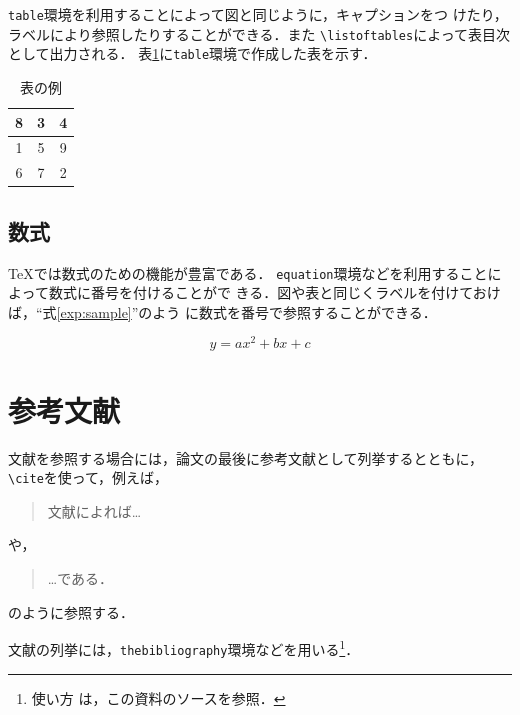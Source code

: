 \documentclass[11pt]{jreport}
\begin{document}
{\tt table}環境を利用することによって図と同じように，キャプションをつ
けたり，ラベルにより参照したりすることができる．また
\verb|\listoftables|によって表目次として出力される．
表\ref{tab:sample}に{\tt table}環境で作成した表を示す．

\begin{table}
  \caption{表の例}
  \label{tab:sample}
  \begin{center}
    \begin{tabular}{|c|c|c|}
      \hline
      8 & 3 & 4\\
      \hline
      1 & 5 & 9 \\
      \hline
      6 & 7 & 2 \\
      \hline
    \end{tabular}
  \end{center}
\end{table}

\section{数式}

\TeX では数式のための機能が豊富である．
{\tt equation}環境などを利用することによって数式に番号を付けることがで
きる．図や表と同じくラベルを付けておけば，``式\ref{exp:sample}''のよう
に数式を番号で参照することができる．

\begin{equation}
  y = ax^2 + bx + c \label{exp:sample}
\end{equation}

\chapter{参考文献}

文献を参照する場合には，論文の最後に参考文献として列挙するとともに，
\verb|\cite|を使って，例えば，
\begin{quote}
  文献\cite{latex}によれば…
\end{quote}
や，
\begin{quote}
  …である\cite{latex2e}．
\end{quote}
のように参照する．

文献の列挙には，{\tt thebibliography}環境などを用いる\footnote{使い方
は，この資料のソースを参照．}．


\end{document}

